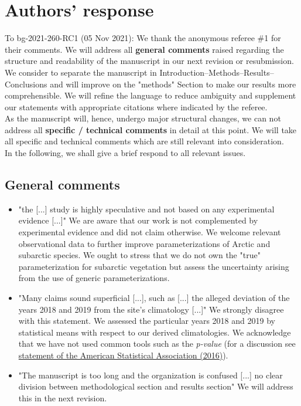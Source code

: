 \documentclass{scrartcl}
\begin{document}
\section*{Authors' response}
To bg-2021-260-RC1 (05 Nov 2021):
We thank the anonymous referee \#1 for their comments.
We will address all \textbf{general comments} raised regarding the structure and readability of the manuscript in our next revision or resubmission. We consider to separate the manuscript in Introduction--Methods--Results--Conclusions and will improve on the "methods" Section to make our results more comprehensible. We will refine the language to reduce ambiguity and supplement our statements with appropriate citations where indicated by the referee.\\
As the manuscript will, hence, undergo major structural changes, we can not address all \textbf{specific / technical comments} in detail at this point. We will take all specific and technical comments which are still relevant into consideration.\\
In the following, we shall give a brief respond to all relevant issues.

\subsection*{General comments} 
\begin{itemize}
    
    \item {\color{blue} "the [...] study is highly speculative and not based on any experimental evidence [...]"} We are aware that our work is not complemented by experimental evidence and did not claim otherwise. We welcome relevant observational data to further improve parameterizations of Arctic and subarctic species. We ought to stress that we do not own the "true" parameterization for subarctic vegetation but assess the uncertainty arising from the use of generic parameterizations.
    \item {\color{blue} "Many claims sound superficial [...], such as [...] the alleged deviation of the years 2018 and 2019 from the site's climatology [...]"} We strongly disagree with this statement. We assessed the particular years 2018 and 2019 by statistical means with respect to our derived climatologies. We acknowledge that we have not used common tools such as the \emph{p-value} (for a discussion see \href{https://doi.org/10.1080/00031305.2016.1154108}{statement of the American Statistical Association (2016)}).
    \item {\color{blue} "The manuscript is too long and the organization is confused  [...] no clear division between methodological section and results section"} We will address this in the next revision.

\end{itemize}
\end{document}
